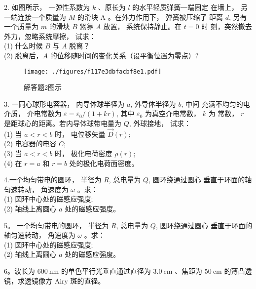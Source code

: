 2. 如图所示， 一弹性系数为 $k$ 、原长为 $l$ 的水平轻质弹簧一端固定 在墙上， 另一端连接一个质量为 $M$ 的滑块 $\mathrm{A}$ 。在外力作用下， 弹簧被压缩了 距离 $d$, 另有一个质量为 $m$ 的滑块 $B$ 紧靠 $A$ 放置， 系统保持静止。在 $t=0$ 时 刻，突然撤去外力，忽略系统摩擦， 试求：\\
(1) 什么时候 $B$ 与 $A$ 脱离？\\
(2) 脱离后，$A$ 的位移随时间的变化关系（设平衡位置为零点）?
\begin{figure}[ht]
\centering
\texttt{[image: ./figures/f117e3dbfacbf8e1.pdf]}
\caption{解答题2图示} \label{fig_CAS12_3}
\end{figure}
3. 一同心球形电容器， 内导体球半径为 $a$, 外导体半径为 $b$, 中间 充满不均匀的电介质， 介电常数为 $\varepsilon=\varepsilon_{0} /(1+k r)$, 其中 $\varepsilon_{0}$ 为真空介电常数， $k$ 为 常数， $r$ 是距球心的距离。若内导体球带电量为 $Q$, 外球接地， 试求：\\
(1) 当 $a<r< b$ 时， 电位移矢量 $\vec{D}(r)$; \\
(2) 电容器的电容 $C$; \\
(3) 当 $a<r< b$ 时， 极化电荷密度 $\rho(r)$; \\
(4) 在 $r=a$ 和 $r=b$ 处的极化电荷面密度。

4.一个均匀带电的圆环， 半径为 $R$, 总电量为 $Q$, 圆环绕通过圆心
垂直于环面的轴匀速转动， 角速度为 $\omega$ 。求：\\
(1) 圆环中心处的磁感应强度;\\
(2) 轴线上离圆心 $a$ 处的磁感应强度。

5。 一个均匀带电的圆环， 半径为 $R$, 总电量为 $Q$, 圆环绕通过圆心 垂直于环面的轴匀速转动， 角速度为 $\omega$ 。求：\\
(1) 圆环中心处的磁感应强度;\\
(2) 轴线上离圆心 $a$ 处的磁感应强度。

6。波长为 $600 \mathrm{~nm}$ 的单色平行光垂直通过直径为 $3.0 \mathrm{~cm}$ 、焦距为 $50 \mathrm{~cm}$ 的薄凸透镜，求透镜像方 Airy 斑的直径。